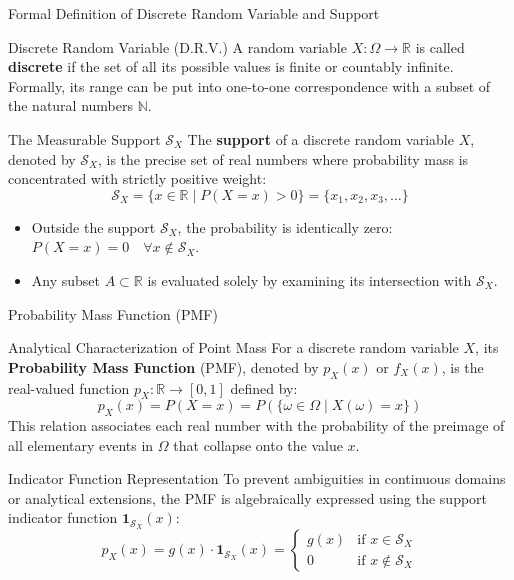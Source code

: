 \documentclass[10pt, aspectratio=169]{beamer}
\begin{document}
\begin{frame}{Formal Definition of Discrete Random Variable and Support}
  \fontsize{7.5pt}{9pt}\selectfont
  \begin{block}{Discrete Random Variable (D.R.V.)}
    \fontsize{7.5pt}{9pt}\selectfont
    A random variable $X: \Omega \to \mathbb{R}$ is called \textbf{discrete} if the set of all its possible values is finite or countably infinite. Formally, its range can be put into one-to-one correspondence with a subset of the natural numbers $\mathbb{N}$.
  \end{block}
  \vspace{-0.15cm}
  \pause
  \begin{alertblock}{The Measurable Support $\mathcal{S}_X$}
    \fontsize{7.5pt}{9pt}\selectfont
    The \textbf{support} of a discrete random variable $X$, denoted by $\mathcal{S}_X$, is the precise set of real numbers where probability mass is concentrated with strictly positive weight:
    $$\mathcal{S}_X = \{x \in \mathbb{R} \mid P(X = x) > 0\} = \{x_1, x_2, x_3, \dots\}$$
    \begin{itemize}\itemsep=0.08cm
      \item Outside the support $\mathcal{S}_X$, the probability is identically zero: $P(X = x) = 0 \quad \forall x \notin \mathcal{S}_X$.
      \item Any subset $A \subset \mathbb{R}$ is evaluated solely by examining its intersection with $\mathcal{S}_X$.
    \end{itemize}
  \end{alertblock}
\end{frame}

\begin{frame}{Probability Mass Function (PMF)}
  \fontsize{7.5pt}{9pt}\selectfont
  \begin{block}{Analytical Characterization of Point Mass}
    \fontsize{7.5pt}{9pt}\selectfont
    For a discrete random variable $X$, its \textbf{Probability Mass Function} (PMF), denoted by $p_X(x)$ or $f_X(x)$, is the real-valued function $p_X: \mathbb{R} \to [0, 1]$ defined by:
    $$p_X(x) = P(X = x) = P(\{\omega \in \Omega \mid X(\omega) = x\})$$
    This relation associates each real number with the probability of the preimage of all elementary events in $\Omega$ that collapse onto the value $x$.
  \end{block}
  \vspace{-0.15cm}
  \pause
  \begin{alertblock}{Indicator Function Representation}
    \fontsize{7.5pt}{9pt}\selectfont
    To prevent ambiguities in continuous domains or analytical extensions, the PMF is algebraically expressed using the support indicator function $\mathbf{1}_{\mathcal{S}_X}(x)$:
    $$p_X(x) = g(x) \cdot \mathbf{1}_{\mathcal{S}_X}(x) = \begin{cases}
      g(x) & \text{if } x \in \mathcal{S}_X \\
      0 & \text{if } x \notin \mathcal{S}_X
    \end{cases}$$
  \end{alertblock}
\end{frame}
\end{document}
